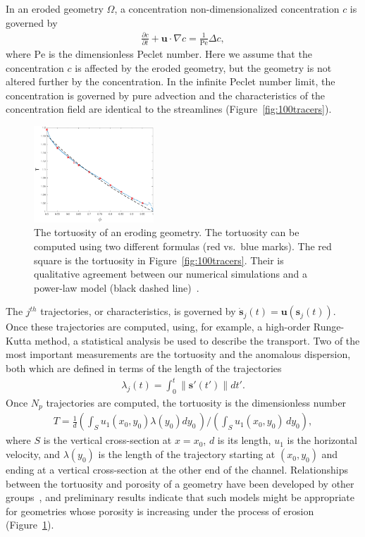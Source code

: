 \documentclass[11pt]{article}
\newcommand{\pd}[2]{ \frac{ \partial #1}{ \partial #2 } }
\newcommand{\bvec}[1]{{\mathbf{#1}}}
\newcommand{\Pe}{\mathrm{Pe}}
\newcommand{\uu}{\bvec{u}}
\renewcommand{\ss}{{\mathbf{s}}}
\begin{document}
In an eroded geometry $\Omega$, a concentration non-dimensionalized
concentration $c$ is governed by
\begin{align}
  \pd{c}{t} + \uu \cdot \nabla c = \frac{1}{\Pe} \Delta c, 
  \label{eqn:advectionDiffusion}
\end{align}
where $\Pe$ is the dimensionless Peclet number. Here we assume that the
concentration $c$ is affected by the eroded geometry, but the geometry
is not altered further by the concentration. In the infinite Peclet
number limit, the concentration is governed by pure advection and the
characteristics of the concentration field are identical to the
streamlines (Figure~\ref{fig:100tracers}).
\begin{figure}
  \includegraphics[width=0.4\textwidth]{figs/tort_eulerian100}
  \caption{\label{fig:100tortuosity} The tortuosity of an eroding
  geometry. The tortuosity can be computed using two different formulas
  (red vs.~blue marks). The red square is the tortuosity in
  Figure~\ref{fig:100tracers}. Their is qualitative agreement between
  our numerical simulations and a power-law model (black dashed
  line)~\cite{mat-kha-koz2008}.}
\end{figure}

The $j^{th}$ trajectories, or characteristics, is governed by
$\dot{\ss}_j(t) = \uu(\ss_j(t))$. Once these trajectories are computed,
using, for example, a high-order Runge-Kutta method, a statistical
analysis be used to describe the transport. Two of the most important
measurements are the tortuosity and the anomalous dispersion, both which
are defined in terms of the length of the trajectories
\begin{align}
  \lambda_j(t) = \int_{0}^{t} \|\ss'(t')\| dt'.
\end{align}
Once $N_p$ trajectories are computed, the tortuosity is the
dimensionless number
\begin{align}
  T = \frac{1}{d} \left(\int_{S} u_1(x_0,y_0)\lambda(y_0) dy_0\, \right)
  \Bigg/ \left(\int_S u_1(x_0,y_0)\, dy_0 \right),
\end{align}
where $S$ is the vertical cross-section at $x=x_0$, $d$ is its length,
$u_1$ is the horizontal velocity, and $\lambda(y_0)$ is the length of
the trajectory starting at $(x_0,y_0)$ and ending at a vertical
cross-section at the other end of the channel. Relationships between the
tortuosity and porosity of a geometry have been developed by other
groups~\cite{kop-kat-tim1996, dud-koz-mat2011, mat-kha-koz2008}, and
preliminary results indicate that such models might be appropriate for
geometries whose porosity is increasing under the process of erosion
(Figure~\ref{fig:100tortuosity}).
\end{document}
